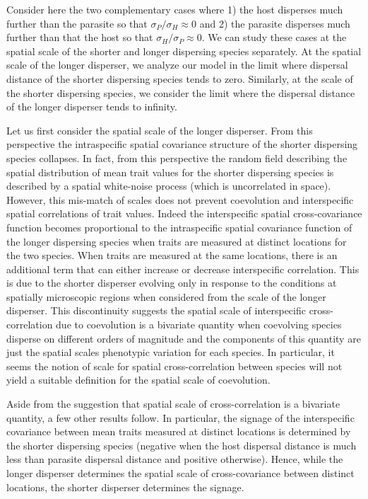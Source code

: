 \documentclass{article}
\begin{document}
Consider here the two complementary cases where 1) the host disperses
much further than the parasite so that \(\sigma_P/\sigma_H\approx0\) and
2) the parasite disperses much further than that the host so that
\(\sigma_H/\sigma_P\approx0\). We can study these cases at the spatial
scale of the shorter and longer dispersing species separately. At the
spatial scale of the longer disperser, we analyze our model in the limit
where dispersal distance of the shorter dispersing species tends to
zero. Similarly, at the scale of the shorter dispersing species, we
consider the limit where the dispersal distance of the longer disperser
tends to infinity.

Let us first consider the spatial scale of the longer disperser. From
this perspective the intraspecific spatial covariance structure of the
shorter dispersing species collapses. In fact, from this perspective the
random field describing the spatial distribution of mean trait values
for the shorter dispersing species is described by a spatial white-noise
process (which is uncorrelated in space). However, this mis-match of
scales does not prevent coevolution and interspecific spatial
correlations of trait values. Indeed the interspecific spatial
cross-covariance function becomes proportional to the intraspecific
spatial covariance function of the longer dispersing species when traits
are measured at distinct locations for the two species. When traits are
measured at the same locations, there is an additional term that can
either increase or decrease interspecific correlation. This is due to
the shorter disperser evolving only in response to the conditions at
spatially microscopic regions when considered from the scale of the
longer disperser. This discontinuity suggests the spatial scale of
interspecific cross-correlation due to coevolution is a bivariate
quantity when coevolving species disperse on different orders of
magnitude and the components of this quantity are just the spatial
scales phenotypic variation for each species. In particular, it seems
the notion of scale for spatial cross-correlation between species will
not yield a suitable definition for the spatial scale of coevolution.

Aside from the suggestion that spatial scale of cross-correlation is a
bivariate quantity, a few other results follow. In particular, the
signage of the interspecific covariance between mean traits measured at
distinct locations is determined by the shorter dispersing species
(negative when the host dispersal distance is much less than parasite
dispersal distance and positive otherwise). Hence, while the longer
disperser determines the spatial scale of cross-covariance between
distinct locations, the shorter disperser determines the signage.
\end{document}
